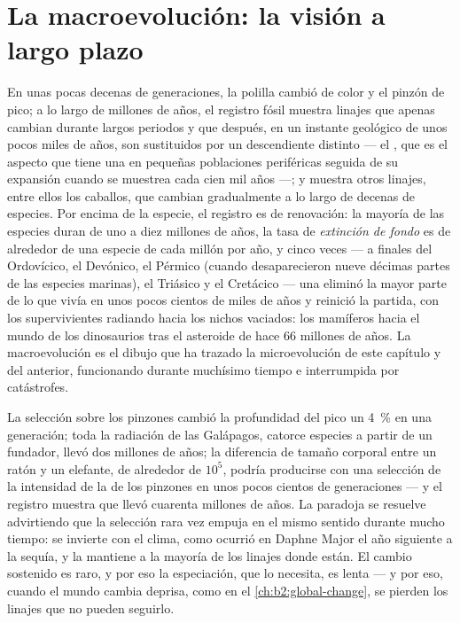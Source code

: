 \section{La macroevolución: la visión a largo plazo}

\begin{proposition}\label{prop:b2:speciation:tempo}
En unas pocas decenas de generaciones, la polilla cambió de color y el
pinzón de pico; a lo largo de millones de años, el registro fósil muestra
linajes que apenas cambian durante largos periodos y que después, en un
instante geológico de unos pocos miles de años, son sustituidos por un
descendiente distinto --- el \emph{}, que es el aspecto
que tiene una  en pequeñas poblaciones periféricas
seguida de su expansión cuando se muestrea cada cien mil años ---; y
muestra otros linajes, entre ellos los caballos, que cambian gradualmente
a lo largo de decenas de especies. Por encima de la especie, el registro
es de renovación: la mayoría de las especies duran de uno a diez millones
de años, la tasa de \emph{extinción de fondo} es de alrededor de una
especie de cada millón por año, y cinco veces --- a finales del
Ordovícico, el Devónico, el Pérmico (cuando desaparecieron nueve décimas
partes de las especies marinas), el Triásico y el Cretácico --- una
\emph{} eliminó la mayor parte de lo que vivía en unos
pocos cientos de miles de años y reinició la partida, con los
supervivientes radiando hacia los nichos vaciados: los mamíferos hacia el
mundo de los dinosaurios tras el asteroide de hace 66 millones de años.
La macroevolución es el dibujo que ha trazado la microevolución de este
capítulo y del anterior, funcionando durante muchísimo tiempo e
interrumpida por catástrofes.
\end{proposition}

\begin{example}\label{ex:b2:speciation:rates}
La selección sobre los pinzones cambió la profundidad del pico un
\qty{4}{\%} en una generación; toda la radiación de las Galápagos, catorce
especies a partir de un fundador, llevó dos millones de años; la
diferencia de tamaño corporal entre un ratón y un elefante, de alrededor de
$10^{5}$, podría producirse con una selección de la intensidad de la de los
pinzones en unos pocos cientos de generaciones ---
y el registro muestra que llevó cuarenta millones de años. La paradoja se
resuelve advirtiendo que la selección rara vez empuja en el mismo sentido
durante mucho tiempo: se invierte con el clima, como ocurrió en Daphne
Major el año siguiente a la sequía, y la  mantiene
a la mayoría de los linajes donde están. El cambio sostenido es raro, y por
eso la especiación, que lo necesita, es lenta --- y por eso, cuando el
mundo cambia deprisa, como en el \cref{ch:b2:global-change}, se pierden
los linajes que no pueden seguirlo.
\end{example}

